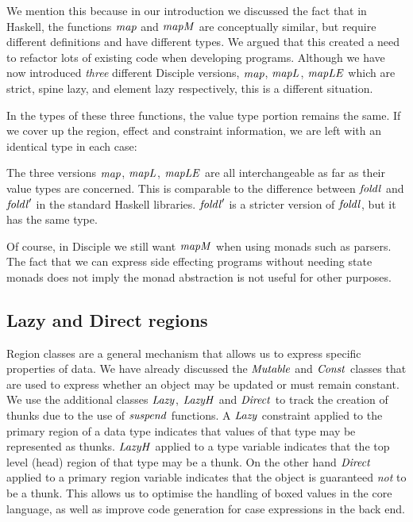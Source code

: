 
We mention this because in our introduction we discussed the fact that in Haskell, the functions $\operatorname{\mathit{map}}$ and $\operatorname{\mathit{mapM}}$ are conceptually similar, but require different definitions and have different types. We argued that this created a need to refactor lots of existing code when developing programs. Although we have now introduced \emph{three} different Disciple versions, $\operatorname{\mathit{map}}$, $\operatorname{\mathit{mapL}}$, $\operatorname{\mathit{mapLE}}$ which are strict, spine lazy, and element lazy respectively, this is a different situation. 

In the types of these three functions, the value type portion remains the same. If we cover up the region, effect and constraint information, we are left with an identical type in each case:


The three versions $\operatorname{\mathit{map}}$, $\operatorname{\mathit{mapL}}$, $\operatorname{\mathit{mapLE}}$ are all interchangeable as far as their value types are concerned. This is comparable to the difference between $\operatorname{\mathit{foldl}}$ and $\operatorname{\mathit{foldl}}'$ in the standard Haskell libraries. $\operatorname{\mathit{foldl}}'$ is a stricter version of $\operatorname{\mathit{foldl}}$, but it has the same type.

Of course, in Disciple we still want $\operatorname{\mathit{mapM}}$ when using monads such as parsers. The fact that we can express side effecting programs without needing state monads does not imply the monad abstraction is not useful for other purposes.


\subsection{Lazy and Direct regions}
\label{System:Effects:lazy-and-direct}

Region classes are a general mechanism that allows us to express specific properties of data. We have already discussed the $\operatorname{\mathit{Mutable}}$ and $\operatorname{\mathit{Const}}$ classes that are used to express whether an object may be updated or must remain constant. We use the additional classes $\operatorname{\mathit{Lazy}}$, $\operatorname{\mathit{LazyH}}$ and $\operatorname{\mathit{Direct}}$ to track the creation of thunks due to the use of $\operatorname{\mathit{suspend}}$ functions. A $\operatorname{\mathit{Lazy}}$ constraint applied to the primary region of a data type indicates that values of that type may be represented as thunks. $\operatorname{\mathit{LazyH}}$ applied to a type variable indicates that the top level (head) region of that type may be a thunk. On the other hand $\operatorname{\mathit{Direct}}$ applied to a primary region variable indicates that the object is guaranteed \emph{not} to be a thunk. This allows us to optimise the handling of boxed values in the core language, as well as improve code generation for case expressions in the back end. 


